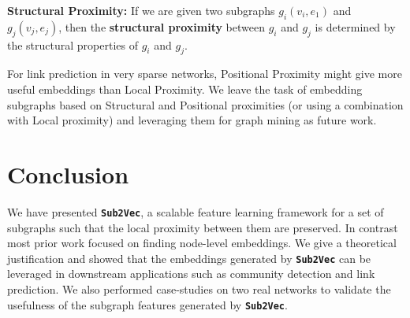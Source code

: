 \documentclass[sigconf]{acmart}
\newcommand{\alg}{{\bf {\tt Sub2Vec}}\xspace}
\begin{document}
\par \noindent \textbf{Structural Proximity:} If we are given two subgraphs $g_i(v_i, e_1)$ and $g_j(v_j, e_j)$, then the \textbf{structural proximity} between $g_i$ and $g_j$ is determined by the structural properties of $g_i$ and $g_j$. 

For link prediction in very sparse networks, Positional Proximity might give more useful embeddings than Local Proximity. 
We leave the task of embedding subgraphs based on Structural and Positional proximities (or using a combination with Local proximity) and leveraging them for graph mining as future work.  

 




\section{Conclusion}
We have presented \alg, a scalable feature learning framework for a set of subgraphs such that the local proximity between them are preserved. In contrast most prior work focused on finding node-level embeddings. 
We give a theoretical justification and showed that the embeddings generated by \alg can be leveraged in downstream applications such as community detection and link prediction. We also performed case-studies on two real networks to validate the usefulness of the subgraph features generated by \alg. 





\end{document}
